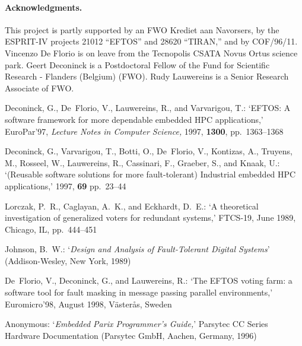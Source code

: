 \documentclass[11pt]{article}
\begin{document}
\paragraph{Acknowledgments.}
This project is partly supported by an 
FWO Krediet aan Navorsers, by the ESPRIT-IV
projects 21012 ``EFTOS'' and 28620 ``TIRAN,'' and by COF/96/11.
Vincenzo De Florio is on leave from the 
Tecnopolis CSATA Novus Ortus science park.
Geert Deconinck is a Postdoctoral Fellow of the 
Fund for Scientific Research - Flanders (Belgium) (FWO).
Rudy Lauwereins is a Senior Research Associate of FWO.

\vfill\eject

\begin{thebibliography}{20}
{\sc Deconinck, G., De~Florio, V., Lauwereins, R., and Varvarigou, T.}:
\newblock `EFTOS: A software framework for more dependable embedded HPC
  applications,'
 EuroPar'97, {\em Lecture Notes in
  Computer Science,} 1997, {\bf 1300}, pp.~1363--1368

{\sc Deconinck, G., Varvarigou, T., Botti, O., De~Florio, V., Kontizas, A.,
  Truyens, M., Rosseel, W., Lauwereins, R., Cassinari, F., Graeber, S., and
  Knaak, U.}:
\newblock `(Reusable software solutions for more fault-tolerant) Industrial
  embedded HPC applications,'
 1997, {\bf 69} pp.~23--44

{\sc Lorczak, P.~R., Caglayan, A.~K., and Eckhardt, D.~E.}:
\newblock `A theoretical investigation of generalized voters for redundant
  systems,'
  FTCS-19, June 1989, Chicago, IL, pp.~444--451

{\sc Johnson, B.~W.}:
\newblock `{\em Design and Analysis of Fault-Tolerant Digital Systems}'
\newblock (Addison-Wesley, New York, 1989)

{\sc De~Florio, V., Deconinck, G., and Lauwereins, R.}:
\newblock `The EFTOS voting farm: a software tool for fault masking in message
  passing parallel environments,'
 Euromicro'98, August 1998, V{\"a}ster\aa{}s, Sweden

{\sc Anonymous}:
\newblock `{\em Embedded Parix Programmer's Guide,}'
\newblock Parsytec CC Series Hardware Documentation (Parsytec GmbH, Aachen,
  Germany, 1996)


\end{thebibliography}
\end{document}
